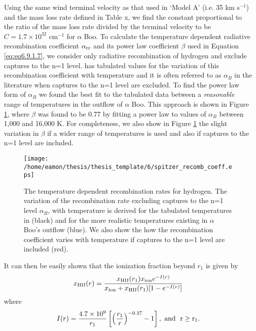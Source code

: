 Using the same wind terminal velocity as that used in `Model A' (i.e. 35 km s$^{-1}$) and the mass loss rate defined in Table x, we find the constant proportional to the ratio of the mass loss rate divided by the terminal velocity to be $C = 1.7 \times 10^{32} $ cm$^{-1}$ for $\alpha$ Boo. To calculate the temperature dependent radiative recombination coefficient $\alpha _{\rm{rr}}$ and its power law coefficient $\beta$ used in Equation \ref{eq:eq6.9.1.7}, we consider only radiative recombination of hydrogen and exclude captures to the n=1 level. \cite{spitzer_1978} has tabulated values for the variation of this recombination coefficient with temperature and it is often referred to as $\alpha _{B}$ in the literature when captures to the n=1 level are excluded. To find the power law form of $\alpha _{B}$ we found the best fit to the tabulated data between a \textit{reasonable} range of temperatures in the outflow of $\alpha$ Boo. This approach is shown in Figure \ref{fig6.9.2}, where $\beta$ was found to be 0.77 by fitting a power law to values of $\alpha _{B}$ between 1,000 and 16,000 K. For completeness, we also show in Figure \ref{fig6.9.2} the slight variation in $\beta$ if a wider range of temperatures is used and also if captures to the n=1 level are included.
\begin{figure}[hbt!]
\centering 
          \texttt{[image: /home/eamon/thesis/thesis\_template/6/spitzer\_recomb\_coeff.eps]}
\caption[The temperature dependent recombination rates for hydrogen.]{The temperature dependent recombination rates for hydrogen. The variation of the recombination rate excluding captures to the n=1 level $\alpha _{B}$, with temperature  is derived for the tabulated temperatures in \cite{spitzer_1978} (black) and for the more realistic temperatures existing in $\alpha$ Boo's outflow (blue). We also show the how the recombination coefficient varies with temperature if captures to the n=1 level are included (red).}
\label{fig6.9.2}
\end{figure}
It can then be easily shown that the ionization fraction beyond $r_{1}$ is given by 
\begin{equation}
x_{\rm{HII}}(r)= \frac{x_{\rm{HII}}(r_1)x_{\rm{ion}}e^{-I(r)}}{x_{\rm{ion}}+x_{\rm{HII}}(r_1)[1 - e^{-I(r)}]}
\label{eq:eq4}
\end{equation}
where
\begin{equation}
I(r) = \frac{4.7\times 10^9}{r_{1}}\left[\left( \frac{r_{1}}{r}\right)^{-0.27} -1 \right], \ \rm{and} \ \  r \geq r_{1}.
\label{eq:eq5}
\end{equation}

